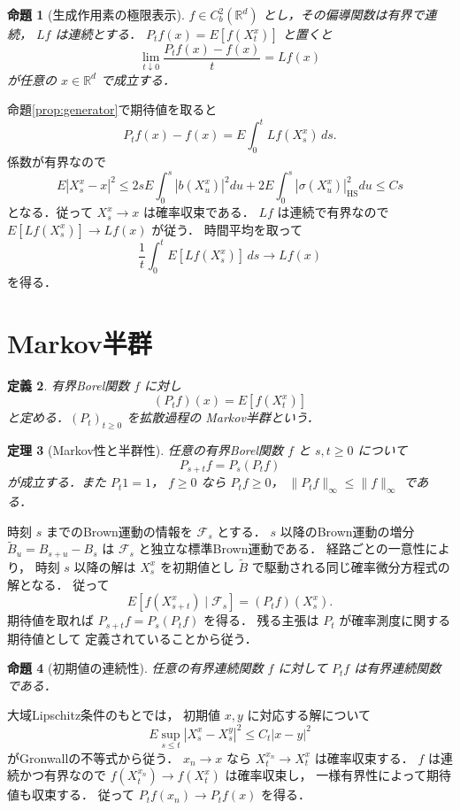 \documentclass[a5paper,10pt,onecolumn]{jsarticle}
\makeatletter
\theoremstyle{mathnotetheorem}
\newtheorem{theorem}{定理}[section]
\newtheorem{definition}[theorem]{定義}
\newtheorem{proposition}[theorem]{命題}
\renewcommand{\proofname}{証明}
\renewenvironment{proof}[1][\proofname]{%
  \par\pushQED{\qed}\normalfont\topsep4\p@\@plus2\p@\relax
  \trivlist\item[\hskip\labelsep\bfseries #1]\ignorespaces
}{\popQED\endtrivlist\@endpefalse}
\newcommand{\norm}[1]{\lVert #1\rVert}
\makeatother
\begin{document}
\begin{proposition}[生成作用素の極限表示]\label{prop:limit-generator}
$f\in C_b^2(\mathbb R^d)$ とし，その偏導関数は有界で連続，
$Lf$ は連続とする．
$P_tf(x)=E[f(X_t^x)]$ と置くと
\[
 \lim_{t\downarrow0}\frac{P_tf(x)-f(x)}{t}
 =Lf(x)
\]
が任意の $x\in\mathbb R^d$ で成立する．
\end{proposition}
\begin{proof}
命題\ref{prop:generator}で期待値を取ると
\[
 P_tf(x)-f(x)=E\int_0^tLf(X_s^x)\,ds.
\]
係数が有界なので
\[
 E|X_s^x-x|^2
 \le2sE\int_0^s|b(X_u^x)|^2du
   +2E\int_0^s|\sigma(X_u^x)|_{\mathrm{HS}}^2du
 \le Cs
\]
となる．従って $X_s^x\to x$ は確率収束である．
$Lf$ は連続で有界なので
$E[Lf(X_s^x)]\to Lf(x)$ が従う．
時間平均を取って
\[
 \frac1t\int_0^tE[Lf(X_s^x)]\,ds\to Lf(x)
\]
を得る．
\end{proof}

\section{Markov半群}

\begin{definition}
有界Borel関数 $f$ に対し
\[
 (P_tf)(x)=E[f(X_t^x)]
\]
と定める．$(P_t)_{t\ge0}$ を拡散過程の
\emph{Markov半群}という．
\end{definition}

\begin{theorem}[Markov性と半群性]\label{thm:semigroup}
任意の有界Borel関数 $f$ と $s,t\ge0$ について
\[
 P_{s+t}f=P_s(P_tf)
\]
が成立する．また $P_t1=1$，
$f\ge0$ なら $P_tf\ge0$，
$\norm{P_tf}_\infty\le\norm f_\infty$ である．
\end{theorem}
\begin{proof}
時刻 $s$ までのBrown運動の情報を $\mathcal F_s$ とする．
$s$ 以降のBrown運動の増分
$\widetilde B_u=B_{s+u}-B_s$ は
$\mathcal F_s$ と独立な標準Brown運動である．
経路ごとの一意性により，
時刻 $s$ 以降の解は $X_s^x$ を初期値とし
$\widetilde B$ で駆動される同じ確率微分方程式の解となる．
従って
\[
 E[f(X_{s+t}^x)\mid\mathcal F_s]
 =(P_tf)(X_s^x).
\]
期待値を取れば $P_{s+t}f=P_s(P_tf)$ を得る．
残る主張は $P_t$ が確率測度に関する期待値として
定義されていることから従う．
\end{proof}

\begin{proposition}[初期値の連続性]\label{prop:feller}
任意の有界連続関数 $f$ に対して
$P_tf$ は有界連続関数である．
\end{proposition}
\begin{proof}
大域Lipschitz条件のもとでは，
初期値 $x,y$ に対応する解について
\[
 E\sup_{s\le t}|X_s^x-X_s^y|^2
 \le C_t|x-y|^2
\]
がGronwallの不等式から従う．
$x_n\to x$ なら $X_t^{x_n}\to X_t^x$ は確率収束する．
$f$ は連続かつ有界なので
$f(X_t^{x_n})\to f(X_t^x)$ は確率収束し，
一様有界性によって期待値も収束する．
従って $P_tf(x_n)\to P_tf(x)$ を得る．
\end{proof}
\end{document}
